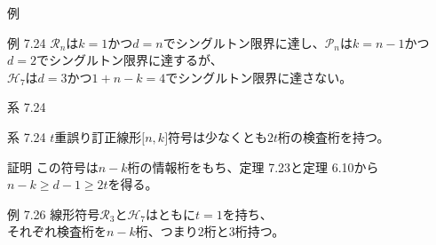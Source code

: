 \documentclass[dvipdfmx,10pt,jsarticle]{beamer}
\begin{document}
  \begin{frame}{例}
    \begin{block}{例 7.24}
      $\mathcal{R}_n$は$k=1$かつ$d=n$でシングルトン限界に達し、$\mathcal{P}_n$は$k = n - 1$かつ$d=2$でシングルトン限界に達するが、 \\
      $\mathcal{H}_7$は$d=3$かつ$1 + n - k = 4$でシングルトン限界に達さない。
    \end{block}
  \end{frame}
  \begin{frame}{系 7.24}
    \begin{block}{系 7.24}
      $t$重誤り訂正線形$\lbrack n,k \rbrack$符号は少なくとも$2t$桁の検査桁を持つ。
    \end{block}
    \begin{block}{証明}
      この符号は$n-k$桁の情報桁をもち、定理 7.23と定理 6.10から $n - k \geq d - 1 \geq 2t$を得る。
    \end{block}
    \begin{block}{例 7.26}
      線形符号$\mathcal{R}_3$と$\mathcal{H}_7$はともに$t=1$を持ち、 \\
      それぞれ検査桁を$n - k$桁、つまり2桁と3桁持つ。
    \end{block}
  \end{frame}
\end{document}
